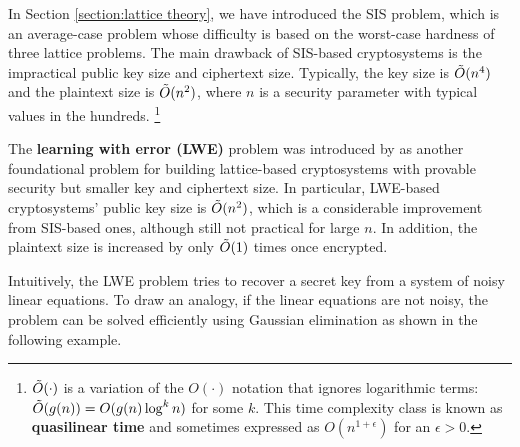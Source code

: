 \documentclass[../main.tex]{subfiles}
\begin{document}
\label{section:lwe}


In Section \ref{section:lattice theory}, we have introduced the SIS problem, which is an average-case problem whose difficulty is based on the worst-case hardness of three lattice problems. The main drawback of SIS-based cryptosystems is the impractical public key size and ciphertext size. Typically, the key size is $\Tilde{O}(n^4)$ and the plaintext size is $\Tilde{O}(n^2)$, where $n$ is a security parameter with typical values in the hundreds. \footnote{$\Tilde{O}(\cdot)$ is a variation of the $O(\cdot)$ notation that ignores logarithmic terms: $\Tilde{O}(g(n))=O(g(n) \log^k n)$ for some $k$. This time complexity class is known as \textbf{quasilinear time} and sometimes expressed as $O(n^{1+\epsilon})$ for an $\epsilon >0$.}

The \textbf{learning with error (LWE)} problem was introduced by \citet{regev05} as another foundational problem for building lattice-based cryptosystems with provable security but smaller key and ciphertext size. 
In particular, LWE-based cryptosystems' public key size is $\Tilde{O}(n^2)$, which is a considerable improvement from SIS-based ones, although still not practical for large $n$. In addition, the plaintext size  is increased by only $\Tilde{O}(1)$ times once encrypted.  


Intuitively, the LWE problem tries to recover a secret key from a system of noisy linear equations. To draw an analogy, if the linear equations are not noisy, the problem can be solved efficiently using Gaussian elimination as shown in the following example. 
\end{document}
